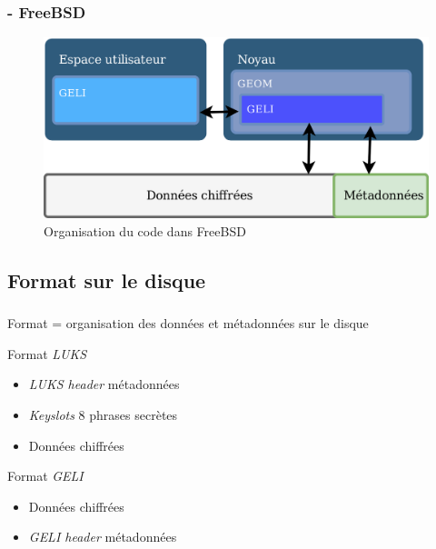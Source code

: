 \begin{frame}
  \frametitle{\insertsubsectionhead - \textbf{FreeBSD}}
  \begin{figure}
    \includegraphics[width=\textwidth]{etat_art/organisation_freebsd}
    \caption{Organisation du code dans FreeBSD}
  \end{figure}
\end{frame}

\subsection{Format sur le disque}

\begin{frame}
  \frametitle{\insertsubsectionhead}
  \begin{center}
    Format = organisation des données et métadonnées sur le disque
  \end{center}
  \pause
  \begin{block}{Format \textit{LUKS}}
    \begin{itemize}
    \item \textit{LUKS header} \textrightarrow{} métadonnées
    \item \textit{Keyslots} \textrightarrow{} 8 phrases secrètes
    \item Données chiffrées
    \end{itemize}
  \end{block}
  \pause
  \begin{block}{Format \textit{GELI}}
    \begin{itemize}
    \item Données chiffrées
    \item \textit{GELI header} \textrightarrow{} métadonnées
    \end{itemize}
  \end{block}
\end{frame}

